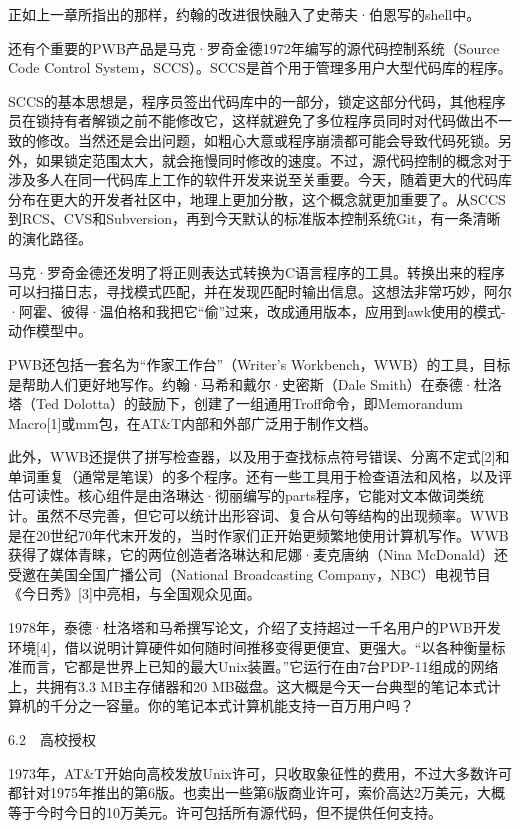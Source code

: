 \documentclass[a4paper,12pt,UTF8,twoside]{ctexbook}
\begin{document}
正如上一章所指出的那样，约翰的改进很快融入了史蒂夫·伯恩写的shell中。

还有个重要的PWB产品是马克·罗奇金德1972年编写的源代码控制系统（Source Code Control System，SCCS）。SCCS是首个用于管理多用户大型代码库的程序。

SCCS的基本思想是，程序员签出代码库中的一部分，锁定这部分代码，其他程序员在锁持有者解锁之前不能修改它，这样就避免了多位程序员同时对代码做出不一致的修改。当然还是会出问题，如粗心大意或程序崩溃都可能会导致代码死锁。另外，如果锁定范围太大，就会拖慢同时修改的速度。不过，源代码控制的概念对于涉及多人在同一代码库上工作的软件开发来说至关重要。今天，随着更大的代码库分布在更大的开发者社区中，地理上更加分散，这个概念就更加重要了。从SCCS到RCS、CVS和Subversion，再到今天默认的标准版本控制系统Git，有一条清晰的演化路径。

马克·罗奇金德还发明了将正则表达式转换为C语言程序的工具。转换出来的程序可以扫描日志，寻找模式匹配，并在发现匹配时输出信息。这想法非常巧妙，阿尔·阿霍、彼得·温伯格和我把它“偷”过来，改成通用版本，应用到awk使用的模式-动作模型中。

PWB还包括一套名为“作家工作台”（Writer’s Workbench，WWB）的工具，目标是帮助人们更好地写作。约翰·马希和戴尔·史密斯（Dale Smith）在泰德·杜洛塔（Ted Dolotta）的鼓励下，创建了一组通用Troff命令，即Memorandum Macro[1]或mm包，在AT\&T内部和外部广泛用于制作文档。

此外，WWB还提供了拼写检查器，以及用于查找标点符号错误、分离不定式[2]和单词重复（通常是笔误）的多个程序。还有一些工具用于检查语法和风格，以及评估可读性。核心组件是由洛琳达·彻丽编写的parts程序，它能对文本做词类统计。虽然不尽完善，但它可以统计出形容词、复合从句等结构的出现频率。WWB是在20世纪70年代末开发的，当时作家们正开始更频繁地使用计算机写作。WWB获得了媒体青睐，它的两位创造者洛琳达和尼娜·麦克唐纳（Nina McDonald）还受邀在美国全国广播公司（National Broadcasting Company，NBC）电视节目《今日秀》[3]中亮相，与全国观众见面。

1978年，泰德·杜洛塔和马希撰写论文，介绍了支持超过一千名用户的PWB开发环境[4]，借以说明计算硬件如何随时间推移变得更便宜、更强大。“以各种衡量标准而言，它都是世界上已知的最大Unix装置。”它运行在由7台PDP-11组成的网络上，共拥有3.3 MB主存储器和20 MB磁盘。这大概是今天一台典型的笔记本式计算机的千分之一容量。你的笔记本式计算机能支持一百万用户吗？





6.2　高校授权


1973年，AT\&T开始向高校发放Unix许可，只收取象征性的费用，不过大多数许可都针对1975年推出的第6版。也卖出一些第6版商业许可，索价高达2万美元，大概等于今时今日的10万美元。许可包括所有源代码，但不提供任何支持。
\end{document}
